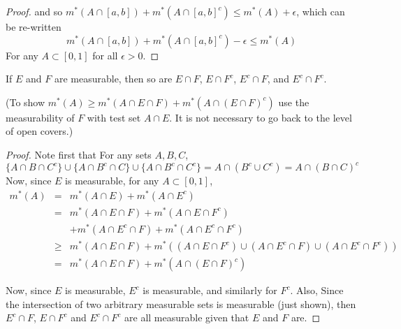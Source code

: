 \begin{pblm}
\begin{proof}
	and so $m^\ast(A \cap [a,b]) + m^\ast(A\cap[a,b]^c) \le m^\ast(A) + \epsilon$, which 
	can be re-written 
	\begin{equation*}
		m^\ast(A \cap [a,b]) + m^\ast(A\cap[a,b]^c) - \epsilon \le m^\ast(A)
	\end{equation*}
	For any $A \subset [0,1]$ for all $\epsilon > 0$. 
\end{proof}
\end{pblm}

\begin{pblm}%
	If $E$ and $F$ are measurable, then so are $E \cap F$, $E \cap F^c$, 
	$E^c \cap F$, and $E^c \cap F^c$. 

	(To show $m^\ast(A) \ge m^\ast(A\cap E\cap F)+m^\ast(A\cap(E\cap F)^c)$ 
	use the measurability of $F$ with test set $A \cap E$. It is not 
	necessary to go back to the level of open covers.)
\begin{proof}
	Note first that For any sets $A, B, C$, 
	\begin{equation*}
		\{A \cap B \cap C^c \}
		\cup 
		\{A \cap B^c \cap C\}
		\cup 
		\{A \cap B^c \cap C^c\} = A \cap (B^c \cup C^c) = A \cap (B \cap C)^c
	\end{equation*}
	Now, since $E$ is measurable, for any $A \subset [0,1]$, 
	\begin{equation*}
	\begin{array}{rcl}
		m^\ast(A) & = & m^\ast(A \cap E) + m^\ast(A \cap E^c) \\
		& = & m^\ast(A \cap E \cap F) + m^\ast(A \cap E \cap F^c) \\
		& & + m^\ast(A \cap E^c \cap F) + m^\ast(A \cap E^c \cap F^c) \\
		& \ge & m^\ast(A \cap E \cap F) + m^\ast((A\cap E\cap F^c)
		{\scriptstyle \cup}(A\cap E^c\cap F){\scriptstyle \cup}(A\cap E^c\cap F^c)) \\
		& = & m^\ast(A \cap E \cap F) + m^\ast(A \cap (E \cap F)^c)  
	\end{array}
	\end{equation*}

	Now, since $E$ is measurable, $E^c$ is measurable, and similarly for $F^c$. Also, 
	Since the intersection of two arbitrary measurable sets is measurable (just shown), 
	then $E^c \cap F$, $E \cap F^c$ and $E^c \cap F^c$ are all measurable given that 
	$E$ and $F$ are. 
\end{proof}
\end{pblm}

